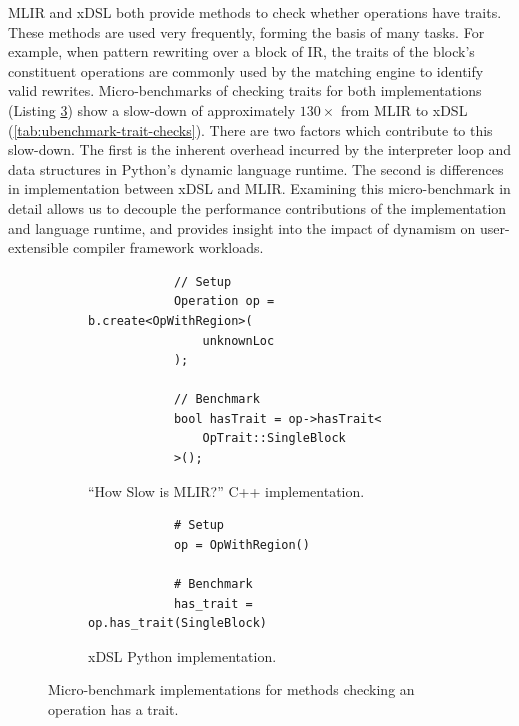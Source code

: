 MLIR and xDSL both provide methods to check whether operations have traits.
These methods are used very frequently, forming the basis of many tasks. For example, when pattern rewriting over a block of IR, the traits of the block's constituent operations are commonly used by the matching engine to identify valid rewrites.
Micro-benchmarks of checking traits for both implementations (Listing \ref{listing:ubenchmark-trait-checks-bench}) show a slow-down of approximately $130\times$ from MLIR to xDSL (\autoref{tab:ubenchmark-trait-checks}). There are two factors which contribute to this slow-down. The first is the inherent overhead incurred by the interpreter loop and data structures in Python's dynamic language runtime. The second is differences in implementation between xDSL and MLIR.
Examining this micro-benchmark in detail allows us to decouple the performance contributions of the implementation and language runtime, and provides insight into the impact of dynamism on user-extensible compiler framework workloads.

\begin{figure}[H]
    \centering
    \begin{subfigure}[b]{0.45\textwidth}
       \centering
        \begin{verbatim}
            // Setup
            Operation op = b.create<OpWithRegion>(
                unknownLoc
            );
            
            // Benchmark
            bool hasTrait = op->hasTrait<
                OpTrait::SingleBlock
            >();
        \end{verbatim}
        \caption{``How Slow is MLIR?'' C++ implementation.}
        \label{listing:ubenchmark-trait-checks-bench-mlir}
    \end{subfigure}
    \hfill
    \begin{subfigure}[b]{0.45\textwidth}
        \centering
        \begin{verbatim}
            # Setup
            op = OpWithRegion()
            
            # Benchmark
            has_trait = op.has_trait(SingleBlock)
        \end{verbatim}
        \footnotesize\vspace{2em}
        \caption{xDSL Python implementation.}
        \label{listing:ubenchmark-trait-checks-bench-xdsl}
    \end{subfigure}
    \vspace{1em}
    \captionsetup{name=Listing}
    \caption{Micro-benchmark implementations for methods checking an operation has a trait.}
    \label{listing:ubenchmark-trait-checks-bench}
\end{figure}


